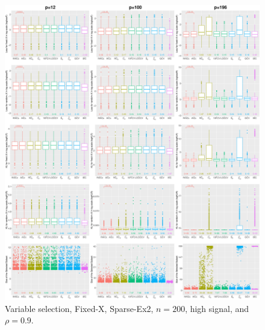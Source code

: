 \begin{figure}[!ht]
\centering
\includegraphics[width=\textwidth]{figures/supplement/fixedx/subset_selection/Sparse-Ex2_n200_hsnr_rho09.eps}
\caption{Variable selection, Fixed-X, Sparse-Ex2, $n=200$, high signal, and $\rho=0.9$.}
\end{figure}
\clearpage
